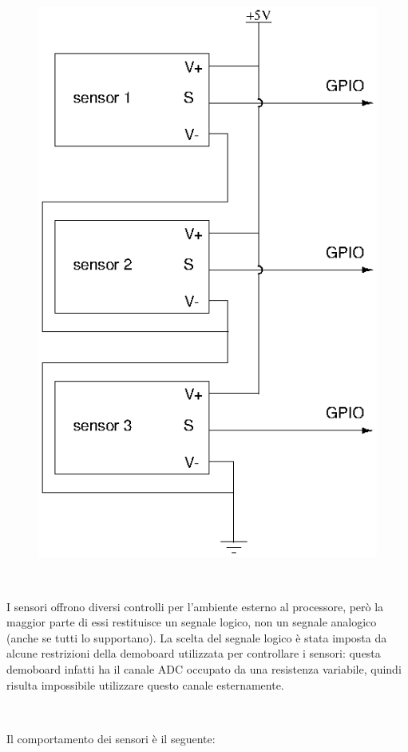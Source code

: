 \documentclass[a4paper,titlepage]{book}
\begin{document}
\begin{figure}[!h]
\centering
\includegraphics[scale=0.5]{circuitSensor.png}
\end{figure}


~

I sensori offrono diversi controlli per l'ambiente esterno al processore, però la maggior parte di essi restituisce un segnale logico, non un segnale analogico (anche se tutti lo supportano). La scelta del segnale logico è stata imposta da alcune restrizioni della demoboard utilizzata per controllare i sensori: questa demoboard infatti ha il canale ADC occupato da una resistenza variabile, quindi risulta impossibile utilizzare questo canale esternamente.

~

Il comportamento dei sensori è il seguente:
\end{document}
